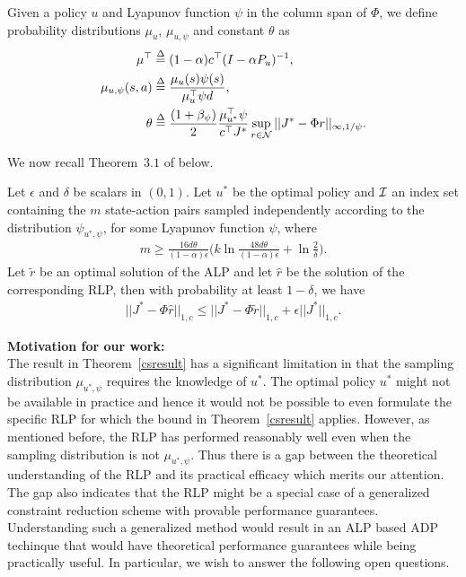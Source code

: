 \documentclass[12pt,draftcls,onecolumn]{IEEEtran}
\begin{document}
\begin{definition}\label{sampdist}
Given a policy $u$ and Lyapunov function $\psi$ in the column span of $\Phi$, we define probability distributions $\mu_u$, $\mu_{u,\psi}$ and constant $\theta$ as 
\begin{align}
\mu^\top&\stackrel{\Delta}{=}(1-\alpha)c^\top (I-\alpha P_u)^{-1},\nonumber\\
\mu_{u,\psi}(s,a)&\stackrel{\Delta}{=}\frac{\mu_{u}(s) \psi(s)}{\mu_u^\top \psi d},\nonumber\\
\theta&\stackrel{\Delta}{=}\frac{(1+\beta_{\psi})}{2}\frac{\mu_{u^*}^\top \psi}{c^\top J^*}\sup_{r\in \mathcal{N}}||J^*-\Phi r||_{\infty,1/\psi}.
\end{align}
\end{definition}
We now recall Theorem~$3.1$ of \cite{CS} below.
\begin{theorem}\label{csresult}
Let $\epsilon$ and $\delta$ be scalars in $(0,1)$. Let $u^*$ be the optimal policy and $\mathcal{I}$ an index set containing the $m$ state-action pairs sampled independently according to the distribution $\psi_{u^*,\psi}$, for some Lyapunov function $\psi$, where
\begin{align}
m\geq \frac{16d\theta}{(1-\alpha)\epsilon}\big(k\ln\frac{48d\theta}{(1-\alpha)\epsilon}+\ln\frac{2}{\delta}\big).
\end{align}
Let $\tilde{r}$ be an optimal	solution of the ALP and let $\hat{r}$ be the solution of the corresponding RLP, then with probability at least $1-\delta$, we have
\begin{align}
||J^*-\Phi \hat{r}||_{1,c}\leq ||J^*-\Phi \tilde{r}||_{1,c}+\epsilon||J^*||_{1,c}.
\end{align}
\end{theorem}
\textbf{Motivation for our work:}\\
The result in Theorem~\ref{csresult} has a significant limitation in that the sampling distribution $\mu_{u^*,\psi}$ requires the knowledge of $u^*$. The optimal policy $u^*$ might not be available in practice and hence it would not be possible to even formulate the specific RLP for which the bound in Theorem~\ref{csresult} applies. However, as mentioned before, the RLP has performed reasonably well even when the sampling distribution is not $\mu_{u^*,\psi}$. Thus there is a gap between the theoretical understanding of the RLP and its practical efficacy which merits our attention. The gap also indicates that the RLP might be a special case of a generalized constraint reduction scheme with provable performance guarantees. Understanding such a generalized method would result in an ALP based ADP techinque that would have theoretical performance guarantees while being practically useful. In particular, we wish to answer the following open questions.
\end{document}
